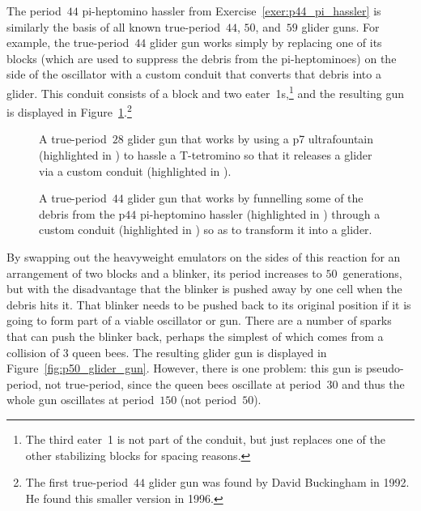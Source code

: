 The period~$44$ pi-heptomino hassler from Exercise~\ref{exer:p44_pi_hassler} is similarly the basis of all known true-period~$44$, $50$, and~$59$ glider guns. For example, the true-period~$44$ glider gun works simply by replacing one of its blocks (which are used to suppress the debris from the pi-heptominoes) on the side of the oscillator with a custom conduit that converts that debris into a glider. This conduit consists of a block and two eater~1s,\footnote{The third eater~1 is not part of the conduit, but just replaces one of the other stabilizing blocks for spacing reasons.} and the resulting gun is displayed in Figure~\ref{fig:p44_glider_gun}.\footnote{The first true-period~$44$ glider gun was found by David Buckingham in 1992. He found this smaller version in 1996.}

\begin{figure}[!htb]
	\centering
	\begin{minipage}{.55\textwidth}
		\centering
		\caption{A true-period~$28$ glider gun that works by using a p7 ultrafountain (highlighted in ) to hassle a T-tetromino so that it releases a glider via a custom conduit (highlighted in ).}\label{fig:p28_glider_gun}
	\end{minipage} \hfill %
	\begin{minipage}{.42\textwidth}
		\centering
		\caption{A true-period~$44$ glider gun that works by funnelling some of the debris from the p$44$ pi-heptomino hassler (highlighted in ) through a custom conduit (highlighted in ) so as to transform it into a glider.}\label{fig:p44_glider_gun}
	\end{minipage}
\end{figure}

By swapping out the heavyweight emulators on the sides of this reaction for an arrangement of two blocks and a blinker, its period increases to $50$~generations, but with the disadvantage that the blinker is pushed away by one cell when the debris hits it. That blinker needs to be pushed back to its original position if it is going to form part of a viable oscillator or gun. There are a number of sparks that can push the blinker back, perhaps the simplest of which comes from a collision of $3$ queen bees. The resulting glider gun is displayed in Figure~\ref{fig:p50_glider_gun}. However, there is one problem: this gun is pseudo-period, not true-period, since the queen bees oscillate at period~$30$ and thus the whole gun oscillates at period~$150$ (not period~$50$).

